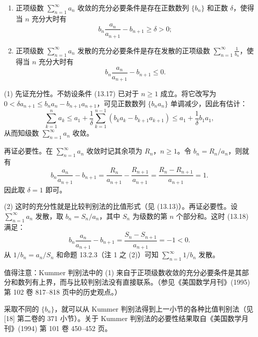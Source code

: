 \begin{xproposition}
\begin{enumerate}[label=(\arabic*)]
\item 正项级数 $\sum_{n=1}^{\infty}a_n$ 收敛的充分必要条件是存在正数数列 $\{b_n\}$ 和正数 $\delta$，使得当 $n$ 充分大时有
\begin{equation}
b_n\frac{a_n}{a_{n+1}}-b_{n+1}\geq\delta>0;
\tag{13.17}
\end{equation}
\item 正项级数 $\sum_{n=1}^{\infty}a_n$ 发散的充分必要条件是存在发散的正项级数 $\sum_{n=1}^{\infty}\frac1{b_n}$，使得当 $n$ 充分大时有
\begin{equation}
b_n\frac{a_n}{a_{n+1}}-b_{n+1}\leq0.
\tag{13.18}
\end{equation}
\end{enumerate}
\end{xproposition}
\begin{xproof}
(1) 先证充分性。不妨设条件 (13.17) 已对于 $n\geq1$ 成立。将它改写为 $0<\delta a_{n+1}\leq b_na_n-b_{n+1}a_{n+1}$，可见正数数列 $\{b_na_n\}$ 单调减少，因此有估计：
\[
\sum_{k=1}^{n}a_k\leq a_1+\frac1\delta\sum_{k=1}^{n-1}(b_ka_k-b_{k+1}a_{k+1})\leq a_1+\frac1\delta b_1a_1,
\]
从而知级数 $\sum_{n=1}^{\infty}a_n$ 收敛。

再证必要性。在 $\sum_{n=1}^{\infty}a_n$ 收敛时记其余项为 $R_n$，$n\geq1$。令 $b_n=R_n/a_n$，则就有
\[
b_n\frac{a_n}{a_{n+1}}-b_{n+1}=\frac{R_n}{a_{n+1}}-\frac{R_{n+1}}{a_{n+1}}=\frac{R_n-R_{n+1}}{a_{n+1}}=1.
\]
因此取 $\delta=1$ 即可。

(2) 这时的充分性就是比较判别法的比值形式（见 (13.13)）。再证必要性。设 $\sum_{n=1}^{\infty}a_n$ 发散，取 $b_n=S_n/a_n$，其中 $S_n$ 为级数的第 $n$ 个部分和。这时 (13.18) 满足：
\[
b_n\frac{a_n}{a_{n+1}}-b_{n+1}=\frac{S_n-S_{n+1}}{a_{n+1}}=-1<0.
\]
从 $1/b_n=a_n/S_n$ 和命题 13.2.3（注 1 之 (2)）可知 $\sum_{n=1}^{\infty}1/b_n$ 发散。
\end{xproof}

\begin{xremark}
值得注意：Kummer 判别法中的 (1) 来自于正项级数收敛的充分必要条件是其部分和数列有上界，而与比较判别法没有直接联系。（参见《美国数学月刊》(1995) 第 102 卷 817--818 页中的历史观点。）
\end{xremark}

\begin{xremark}
采取不同的 $\{b_n\}$，就可以从 Kummer 判别法得到上一小节的各种比值判别法（见 [18] 第二卷的 371 小节）。关于 Kummer 判别法的必要性结果取自《美国数学月刊》(1994) 第 101 卷 450--452 页。
\end{xremark}

